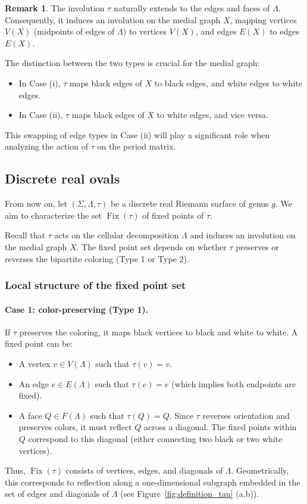 \documentclass[11pt,a4paper]{article}
\theoremstyle{definition}
\newtheorem*{remark}{Remark}
\DeclareMathOperator{\fix}{\mathrm{Fix}}
\begin{document}
\begin{remark}
	The involution $\tau$ naturally extends to the edges and faces of $\Lambda$. Consequently, it induces an involution on the medial graph $X$, mapping vertices $V(X)$ (midpoints of edges of $\Lambda$) to vertices $V(X)$, and edges $E(X)$ to edges $E(X)$.
	
	The distinction between the two types is crucial for the medial graph:
	\begin{itemize}
		\item In Case (i), $\tau$ maps black edges of $X$ to black edges, and white edges to white edges.
		\item In Case (ii), $\tau$ maps black edges of $X$ to white edges, and vice versa.
	\end{itemize}
	This swapping of edge types in Case (ii) will play a significant role when analyzing the action of $\tau$ on the period matrix.
\end{remark}

\subsection{Discrete real ovals}\label{sec:discrete_ovals}

From now on, let $(\Sigma, \Lambda, \tau)$ be a discrete real Riemann surface of genus $g$. We aim to characterize the set $\fix(\tau)$ of fixed points of $\tau$.

Recall that $\tau$ acts on the cellular decomposition $\Lambda$ and induces an involution on the medial graph $X$. The fixed point set depends on whether $\tau$ preserves or reverses the bipartite coloring (Type 1 or Type 2).

\subsubsection*{Local structure of the fixed point set}

\paragraph{Case 1: color-preserving (Type 1).}
If $\tau$ preserves the coloring, it maps black vertices to black and white to white. A fixed point can be:
\begin{itemize}
	\item A vertex $v \in V(\Lambda)$ such that $\tau(v) = v$.
	\item An edge $e \in E(\Lambda)$ such that $\tau(e) = e$ (which implies both endpoints are fixed).
	\item A face $Q \in F(\Lambda)$ such that $\tau(Q) = Q$. Since $\tau$ reverses orientation and preserves colors, it must reflect $Q$ across a diagonal. The fixed points within $Q$ correspond to this diagonal (either connecting two black or two white vertices).
\end{itemize}
Thus, $\fix(\tau)$ consists of vertices, edges, and diagonals of $\Lambda$. Geometrically, this corresponds to reflection along a one-dimensional subgraph embedded in the set of edges and diagonals of $\Lambda$ (see Figure~\ref{fig:definition_tau} (a,b)).
\end{document}
